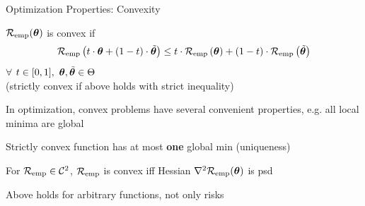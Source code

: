 \documentclass[11pt,compress,t,notes=noshow, xcolor=table]{beamer}
\begin{document}
\begin{vbframe}{Optimization Properties: Convexity}

\begin{itemizeL}

\item $\mathcal{R}_{\text{emp}}(\bm{\theta})$ is convex if
$$
\mathcal{R}_{\text{emp}}\left(t \cdot \bm{\theta} + (1 - t) \cdot \tilde {\bm{\theta}}\right) \le t \cdot
\mathcal{R}_{\text{emp}}\left(\bm{\theta}\right) + (1 - t) \cdot \mathcal{R}_{\text{emp}}\left(\tilde {\bm{\theta}} \right)
$$
$\forall$ $t \in [0, 1], ~\bm{\theta}, \tilde {\bm{\theta}} \in \Theta$\\
(strictly convex if above holds with strict inequality)

\item In optimization, convex problems have several convenient properties, e.g. all local minima are global 
\item Strictly convex function has at most \textbf{one} global min (uniqueness)

\item For $\mathcal{R}_{\text{emp}} \in \mathcal{C}^{2}$, $\mathcal{R}_{\text{emp}}$ is convex iff Hessian $\nabla^2 \mathcal{R}_{\text{emp}}(\bm{\theta})$ is psd

\item Above holds for arbitrary functions, not only risks
  
\end{itemizeL}

\end{vbframe}

\end{document}
